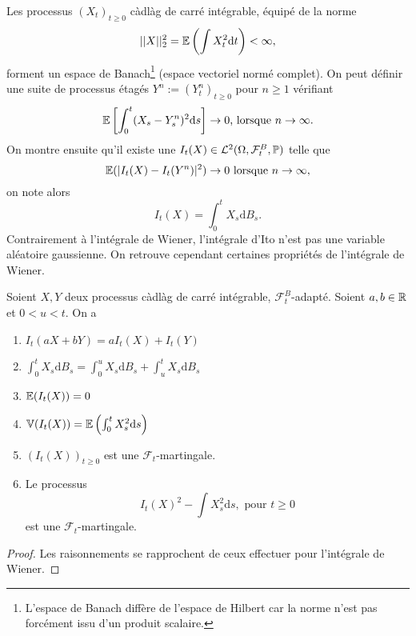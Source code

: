 Les processus $(X_t)_{t\geq 0}$ càdlàg de carré intégrable, équipé de la norme
$$
||X||_2^2 = \mathbb{E}\left(\int X_t^2\text{d}t\right)<\infty,
$$ 
forment un espace de Banach\footnote{L'espace de Banach diffère de l'espace de Hilbert car la norme n'est pas forcément issu d'un produit scalaire.} (espace vectoriel normé complet). On peut définir une suite de processus étagés $Y^n:=(Y_t^n)_{t\geq 0}$ pour $n\geq 1$ vérifiant 
$$
\mathbb{E}\left[\int_0^t(X_s - Y_s^n)^2\text{d}s\right]\rightarrow 0\text{, lorsque }n\rightarrow \infty.
$$
On montre ensuite qu'il existe une \va $I_t(X)\in \mathcal{L}^2(\Omega,\mathcal{F}_t^B, \mathbb{P})$ telle que 
$$
\mathbb{E}(|I_t(X) - I_t(Y^n)|^2)\rightarrow 0\text{ lorsque }n\rightarrow\infty,
$$
on note alors 
$$
I_t(X) = \int_0^t X_s\text{d}B_s.
$$
Contrairement à l'intégrale de Wiener, l'intégrale d'Ito n'est pas une variable aléatoire gaussienne. On retrouve cependant certaines propriétés de l'intégrale de Wiener.
\begin{prop}
Soient $X,Y$ deux processus càdlàg de carré intégrable, $\mathcal{F}_t^B$-adapté. Soient $a,b\in \mathbb{R}$ et $0<u<t$. On a 
\begin{enumerate}
\item $I_t(aX+bY) = aI_t(X)+I_t(Y)$
\item $\int_0^tX_s\text{d}B_s = \int_0^uX_s\text{d}B_s + \int_u^tX_s\text{d}B_s$
\item $\mathbb{E}(I_t(X)) = 0$
\item $\mathbb{V}(I_t(X)) = \mathbb{E}\left(\int_0^t X_s^2\text{d}s\right)$
\item $(I_t(X))_{t\geq 0}$ est une $\mathcal{F}_t$-martingale.
\item Le processus 
$$
I_t(X)^2 - \int X_s^2\text{d}s,\text{ pour }t\geq 0
$$ 
est une $\mathcal{F}_t$-martingale.
\end{enumerate}
\end{prop}
\begin{proof}
Les raisonnements se rapprochent de ceux effectuer pour l'intégrale de Wiener. 
\end{proof}
